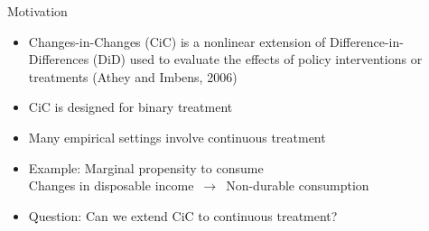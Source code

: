 \documentclass[aspectratio=1610, 9pt]{beamer}
\begin{document}
\begin{frame}{Motivation}

\begin{itemize}

\item Changes-in-Changes (CiC) is a nonlinear extension of Difference-in-Differences (DiD) used to evaluate the effects of policy interventions or treatments (Athey and Imbens, 2006)
\item  CiC is designed for binary treatment
\item Many empirical settings involve continuous treatment
\item Example: Marginal propensity to consume \\
  Changes in disposable income\ $\to$\ Non-durable consumption
  \item Question: Can we extend CiC to continuous treatment?




    
  

\end{itemize}
\end{frame}
\end{document}
